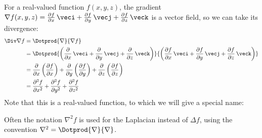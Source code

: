 For a real-valued function $f(x,y,z)$, the gradient $\nabla f(x,y,z) =\frac{\partial f}{\partial x}\,\veci + \frac{\partial f}{\partial y}\,\vecj + \frac{\partial f}{\partial z}\,\veck$ is a vector field, so we can take its divergence:
\begin{align*}
 \Div\nabla f &= \Dotprod{\nabla}{\nabla f}\\
  &= \Dotprod{ \left( \frac{\partial}{\partial x}\,\veci + \frac{\partial}{\partial y}\,\vecj +
  \frac{\partial}{\partial z}\,\veck \right) }{\left( \frac{\partial f}{\partial x}\,\veci +
  \frac{\partial f}{\partial y}\,\vecj + \frac{\partial f}{\partial z}\,\veck \right) }\\
  &= \frac{\partial}{\partial x}\left( \frac{\partial f}{\partial x} \right) +
   \frac{\partial}{\partial y}\left( \frac{\partial f}{\partial y} \right) +
   \frac{\partial}{\partial z}\left( \frac{\partial f}{\partial z} \right)\\
  &= \frac{\partial^2 f}{\partial x^2} + \frac{\partial^2 f}{\partial y^2} + \frac{\partial^2 f}{\partial z^2}
\end{align*}
Note that this is a real-valued function, to which we will give a special name:


Often the notation $\nabla^2 f$ is used for the Laplacian instead of $\Delta f$, using the convention $\nabla^2 = \Dotprod{\nabla}{\nabla}$.\index{$\Delta$}

